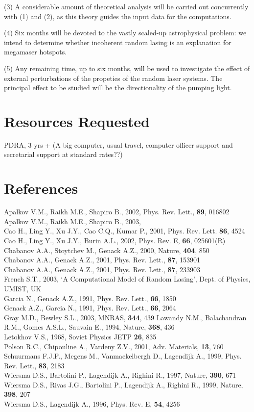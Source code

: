 (3) A considerable amount of theoretical analysis will
be carried out concurrently with (1) and (2), as this theory guides the
input data for the computations.

(4) Six months will be devoted to the vastly scaled-up astrophysical problem:
 we intend to determine whether incoherent random lasing is an explanation
for megamaser hotspots.

(5) Any remaining time, up to six months, will be used to investigate the
effect of external perturbations of the propeties of the random laser
systems. The principal effect to be studied will be the directionality of
the pumping light.

\section{Resources Requested}

PDRA, 3 yrs +
(A big computer, usual travel, computer officer support and secretarial
support at standard rates??)

\section{References}

Apalkov V.M., Raikh M.E., Shapiro B., 2002, Phys. Rev. Lett., {\bf 89}, 016802
Apalkov V.M., Raikh M.E., Shapiro B., 2003, \\
Cao H., Ling Y., Xu J.Y., Cao C.Q., Kumar P., 2001, Phys. Rev. Lett. {\bf 86},
4524\\
Cao H., Ling Y., Xu J.Y., Burin A.L., 2002, Phys. Rev. E, {\bf 66}, 025601(R)
Chabanov A.A., Stoytchev M., Genack A.Z., 2000, Nature, {\bf 404}, 850\\
Chabanov A.A., Genack A.Z., 2001, Phys. Rev. Lett., {\bf 87}, 153901\\
Chabanov A.A., Genack A.Z., 2001, Phys. Rev. Lett., {\bf 87}, 233903\\
French S.T., 2003, `A Computational Model of Random Lasing', Dept. of Physics,
UMIST, UK\\
Garcia N., Genack A.Z., 1991, Phys. Rev. Lett., {\bf 66}, 1850\\
Genack A.Z., Garcia N., 1991, Phys. Rev. Lett., {\bf 66}, 2064\\
Gray M.D., Bewley S.L., 2003, MNRAS, {\bf 344}, 439
Lawandy N.M., Balachandran R.M., Gomes A.S.L., Sauvain E., 1994, Nature, {\bf 368}, 436\\
Letokhov V.S., 1968, Soviet Physics JETP {\bf 26}, 835\\
Polson R.C., Chipouline A., Vardeny Z.V., 2001, Adv. Materials, {\bf 13}, 760
Schuurmans F.J.P., Megens M., Vanmaekelbergh D., Lagendijk A., 1999, Phys. Rev.
Lett., {\bf 83}, 2183\\
Wiersma D.S., Bartolini P., Lagendijk A., Righini R., 1997, Nature, {\bf 390},
671\\
Wiersma D.S., Rivas J.G., Bartolini P., Lagendijk A., Righini R., 1999, Nature, {\bf 398}, 207\\
Wiersma D.S., Lagendijk A., 1996, Phys. Rev. E, {\bf 54}, 4256\\

